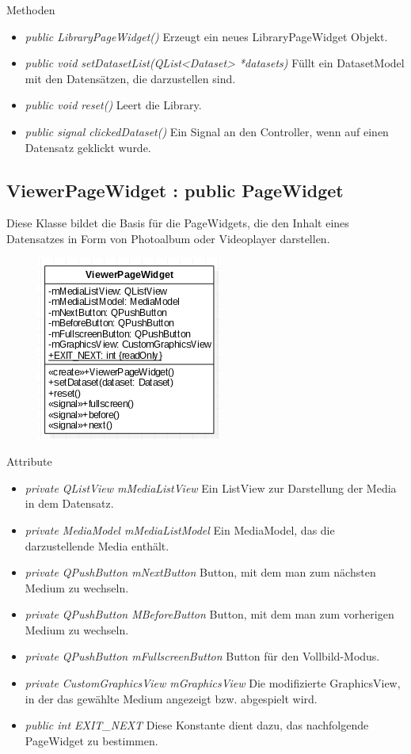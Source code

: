 Methoden
\begin{itemize}
	\item\textit{public LibraryPageWidget()} 
	Erzeugt ein neues LibraryPageWidget Objekt.
	\item\textit{public void setDatasetList(QList<Dataset> *datasets)} 
	Füllt ein DatasetModel mit den Datensätzen, die darzustellen sind.
	\item\textit{public void reset()} 
	Leert die Library.
	\item\textit{public signal clickedDataset()} 
	Ein Signal an den Controller, wenn auf einen Datensatz geklickt wurde.
\end{itemize}

\subsection*{ViewerPageWidget : public PageWidget}
Diese Klasse bildet die Basis für die PageWidgets, die den Inhalt eines Datensatzes in Form von Photoalbum oder Videoplayer darstellen.

\begin{figure}[H]
	\centering
	\includegraphics[scale=0.5]{img/Klassendiagramm/Klassen/View/ViewerPageWidget}
	\label{fig:viewerPageWidget}
\end{figure}

Attribute
\begin{itemize}
	\item\textit{private QListView mMediaListView}
	Ein ListView zur Darstellung der Media in dem Datensatz.
	\item\textit{private MediaModel mMediaListModel} 
	Ein MediaModel, das die darzustellende Media enthält.
	\item\textit{private QPushButton mNextButton}
	Button, mit dem man zum nächsten Medium zu wechseln. 
	\item\textit{private QPushButton MBeforeButton}
	Button, mit dem man zum vorherigen Medium zu wechseln.
	\item\textit{private QPushButton mFullscreenButton}
	Button für den Vollbild-Modus.
	\item\textit{private CustomGraphicsView mGraphicsView} 
	Die modifizierte GraphicsView, in der das gewählte Medium angezeigt bzw. abgespielt wird.  
	\item\textit{public int EXIT\_NEXT} 
	Diese Konstante dient dazu, das nachfolgende PageWidget zu bestimmen.     
\end{itemize}

